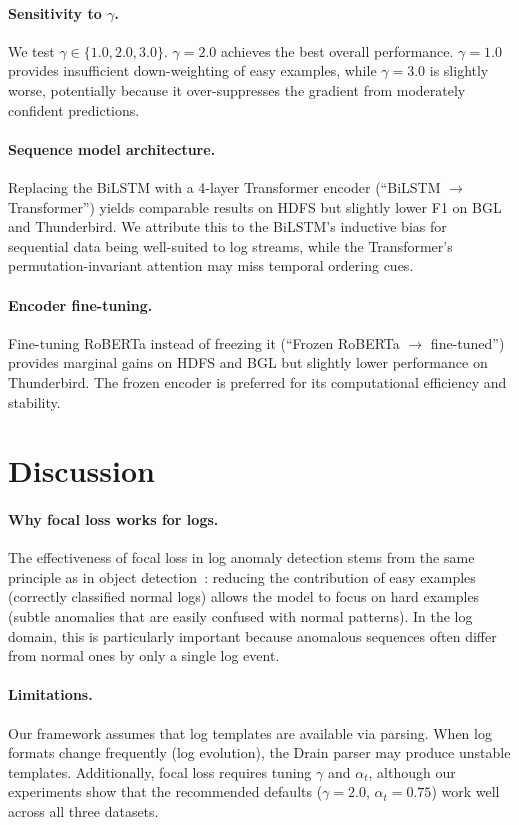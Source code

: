 \documentclass[conference]{IEEEtran}
\begin{document}
\paragraph{Sensitivity to $\gamma$.}
We test $\gamma \in \{1.0, 2.0, 3.0\}$.
$\gamma = 2.0$ achieves the best overall performance.
$\gamma = 1.0$ provides insufficient down-weighting of easy examples,
while $\gamma = 3.0$ is slightly worse, potentially because it over-suppresses
the gradient from moderately confident predictions.

\paragraph{Sequence model architecture.}
Replacing the BiLSTM with a 4-layer Transformer encoder (``BiLSTM $\to$ Transformer'')
yields comparable results on HDFS but slightly lower F1 on BGL and Thunderbird.
We attribute this to the BiLSTM's inductive bias for sequential data being well-suited to log streams,
while the Transformer's permutation-invariant attention may miss temporal ordering cues.

\paragraph{Encoder fine-tuning.}
Fine-tuning RoBERTa instead of freezing it (``Frozen RoBERTa $\to$ fine-tuned'')
provides marginal gains on HDFS and BGL but slightly lower performance on Thunderbird.
The frozen encoder is preferred for its computational efficiency and stability.

\section{Discussion}\label{sec:discussion}

\paragraph{Why focal loss works for logs.}
The effectiveness of focal loss in log anomaly detection stems from the same principle
as in object detection~\cite{lin2017focal}: reducing the contribution of easy examples
(correctly classified normal logs) allows the model to focus on hard examples
(subtle anomalies that are easily confused with normal patterns).
In the log domain, this is particularly important because anomalous sequences
often differ from normal ones by only a single log event.

\paragraph{Limitations.}
Our framework assumes that log templates are available via parsing.
When log formats change frequently (log evolution),
the Drain parser may produce unstable templates.
Additionally, focal loss requires tuning $\gamma$ and $\alpha_t$,
although our experiments show that the recommended defaults ($\gamma = 2.0$, $\alpha_t = 0.75$)
work well across all three datasets.
\end{document}

